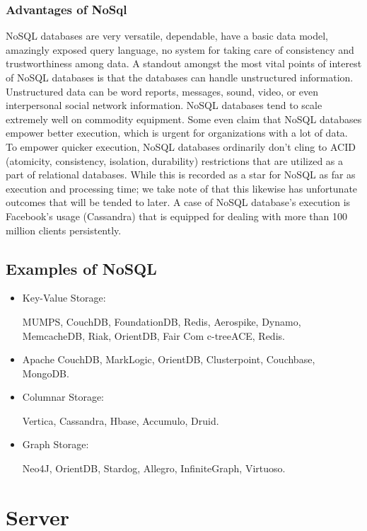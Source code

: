 \subsubsection{Advantages of NoSql}
NoSQL databases are very versatile, dependable, have a basic data model, amazingly exposed query language, no system for taking care of consistency and trustworthiness among data. A standout amongst the most vital points of interest of NoSQL databases is that the databases can handle unstructured information. Unstructured data can be word reports, messages, sound, video, or even interpersonal social network information. NoSQL databases tend to scale extremely well on commodity equipment. Some even claim that NoSQL databases empower better execution, which is urgent for organizations with a lot of data. To empower quicker execution, NoSQL databases ordinarily don't cling to ACID (atomicity, consistency, isolation, durability) restrictions that are utilized as a part of relational databases. While this is recorded as a star for NoSQL as far as execution and processing time; we take note of that this likewise has unfortunate outcomes that will be tended to later. A case of NoSQL database's execution is Facebook's usage (Cassandra) that is equipped for dealing with more than 100 million clients persistently. \cite{AdvantagesnoSql}

\subsection{Examples of NoSQL}
\begin{itemize}
\item Key-Value Storage: \par
MUMPS, CouchDB, FoundationDB, Redis, Aerospike, Dynamo, MemcacheDB, Riak, OrientDB, Fair Com c-treeACE, Redis.

\item Apache CouchDB, MarkLogic, OrientDB, Clusterpoint, Couchbase, MongoDB.

\item Columnar Storage:  \par
Vertica, Cassandra, Hbase, Accumulo, Druid.

\item Graph Storage:  \par
Neo4J, OrientDB, Stardog, Allegro, InfiniteGraph, Virtuoso. 
\end{itemize}

\section{Server}

